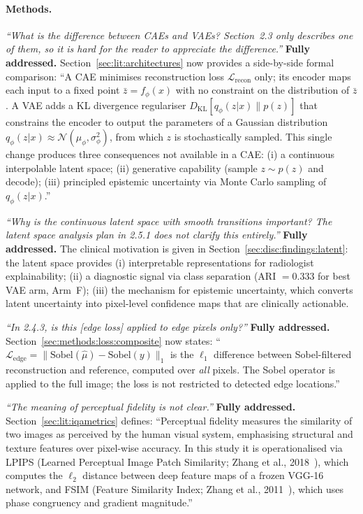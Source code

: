 \documentclass[12pt, a4paper, twoside, openright]{book}
\begin{document}
\begin{appendices}
\paragraph{Methods.}
\textit{``What is the difference between CAEs and VAEs? Section~2.3 only describes one of them, so it is hard for the reader to appreciate the difference.''}
\textbf{Fully addressed.} Section~\ref{sec:lit:architectures} now provides a side-by-side formal comparison: ``A CAE minimises reconstruction loss $\mathcal{L}_{\mathrm{recon}}$ only; its encoder maps each input to a fixed point $\bar{z} = f_\phi(x)$ with no constraint on the distribution of $\bar{z}$. A VAE adds a KL divergence regulariser $D_{\mathrm{KL}}[q_\phi(z|x) \| p(z)]$ that constrains the encoder to output the parameters of a Gaussian distribution $q_\phi(z|x) \approx \mathcal{N}(\mu_\phi, \sigma^2_\phi)$, from which $z$ is stochastically sampled. This single change produces three consequences not available in a CAE: (i) a continuous interpolable latent space; (ii) generative capability (sample $z \sim p(z)$ and decode); (iii) principled epistemic uncertainty via Monte Carlo sampling of $q_\phi(z|x)$.''

\textit{``Why is the continuous latent space with smooth transitions important? The latent space analysis plan in 2.5.1 does not clarify this entirely.''}
\textbf{Fully addressed.} The clinical motivation is given in Section~\ref{sec:disc:findings:latent}: the latent space provides (i) interpretable representations for radiologist explainability; (ii) a diagnostic signal via class separation (ARI $=0.333$ for best VAE arm, Arm~F); (iii) the mechanism for epistemic uncertainty, which converts latent uncertainty into pixel-level confidence maps that are clinically actionable.

\textit{``In 2.4.3, is this [edge loss] applied to edge pixels only?''}
\textbf{Fully addressed.} Section~\ref{sec:methods:loss:composite} now states: ``$\mathcal{L}_{\mathrm{edge}} = \|\mathrm{Sobel}(\hat{\mu}) - \mathrm{Sobel}(y)\|_1$ is the $\ell_1$ difference between Sobel-filtered reconstruction and reference, computed over \emph{all} pixels. The Sobel operator is applied to the full image; the loss is not restricted to detected edge locations.''

\textit{``The meaning of perceptual fidelity is not clear.''}
\textbf{Fully addressed.} Section~\ref{sec:lit:iqametrics} defines: ``Perceptual fidelity measures the similarity of two images as perceived by the human visual system, emphasising structural and texture features over pixel-wise accuracy. In this study it is operationalised via LPIPS (Learned Perceptual Image Patch Similarity; Zhang et al., 2018~\cite{zhang_unreasonable_2018}), which computes the $\ell_2$ distance between deep feature maps of a frozen VGG-16 network, and FSIM (Feature Similarity Index; Zhang et al., 2011~\cite{zhang_fsim_2011}), which uses phase congruency and gradient magnitude.''


\end{appendices}
\end{document}
